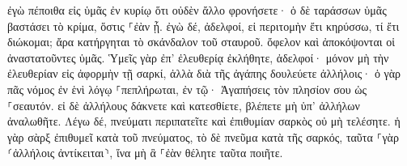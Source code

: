 \documentclass{openreader}
\begin{document}
ἐγὼ πέποιθα εἰς ὑμᾶς ἐν κυρίῳ ὅτι οὐδὲν ἄλλο φρονήσετε· ὁ δὲ ταράσσων ὑμᾶς βαστάσει τὸ κρίμα, ὅστις ⸀ἐὰν ᾖ. 
ἐγὼ δέ, ἀδελφοί, εἰ περιτομὴν ἔτι κηρύσσω, τί ἔτι διώκομαι; ἄρα κατήργηται τὸ σκάνδαλον τοῦ σταυροῦ. 
ὄφελον καὶ ἀποκόψονται οἱ ἀναστατοῦντες ὑμᾶς. 
Ὑμεῖς γὰρ ἐπ’ ἐλευθερίᾳ ἐκλήθητε, ἀδελφοί· μόνον μὴ τὴν ἐλευθερίαν εἰς ἀφορμὴν τῇ σαρκί, ἀλλὰ διὰ τῆς ἀγάπης δουλεύετε ἀλλήλοις· 
ὁ γὰρ πᾶς νόμος ἐν ἑνὶ λόγῳ ⸀πεπλήρωται, ἐν τῷ· Ἀγαπήσεις τὸν πλησίον σου ὡς ⸀σεαυτόν. 
εἰ δὲ ἀλλήλους δάκνετε καὶ κατεσθίετε, βλέπετε μὴ ὑπ’ ἀλλήλων ἀναλωθῆτε. 
Λέγω δέ, πνεύματι περιπατεῖτε καὶ ἐπιθυμίαν σαρκὸς οὐ μὴ τελέσητε. 
ἡ γὰρ σὰρξ ἐπιθυμεῖ κατὰ τοῦ πνεύματος, τὸ δὲ πνεῦμα κατὰ τῆς σαρκός, ταῦτα ⸀γὰρ ⸂ἀλλήλοις ἀντίκειται⸃, ἵνα μὴ ἃ ⸀ἐὰν θέλητε ταῦτα ποιῆτε. 
\end{document}
